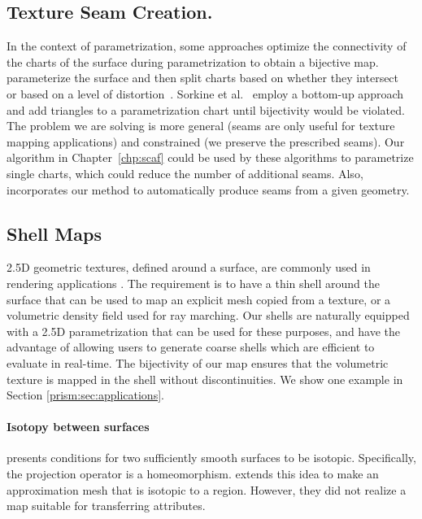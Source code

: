 \subsection*{Texture Seam Creation.}
In the context of parametrization, some approaches optimize the connectivity of the charts of the surface during parametrization to obtain a bijective map.  \cite{Levy:2002,Zhou:2004} parameterize the surface and then split charts based on whether they intersect~\cite{Levy:2002} or based on a level of distortion~\cite{Zhou:2004}.  Sorkine et al.~\cite{Sorkine:2002} employ a bottom-up approach and add triangles to a parametrization chart until bijectivity would be violated. The problem we are solving is more general (seams are only useful for texture mapping applications) and constrained (we preserve the prescribed seams). Our algorithm in Chapter~\ref{chp:scaf} could be used by these algorithms to parametrize single charts, which could reduce the number of additional seams. Also, \cite{li2018optcuts} incorporates our method to automatically produce seams from a given geometry.

\subsection*{Shell Maps}
2.5D geometric textures, defined around a surface, are commonly used in rendering applications \cite{wang2003view,wang2004generalized,porumbescu2005shell,peng2004interactive,lengyel2001real,chen2004shell,huang2007gradient,jin2019shell}. The requirement is to have a thin shell around the surface that can be used to map an explicit mesh copied from a texture, or a volumetric density field used for ray marching. Our shells are naturally equipped with a 2.5D parametrization that can be used for these purposes, and have the advantage of allowing users to  generate coarse shells which are efficient to evaluate in real-time. The bijectivity of our map ensures that the  volumetric texture is mapped in the shell without discontinuities. We show one example in Section \ref{prism:sec:applications}.

\paragraph{Isotopy between surfaces}
{\cite{chazal2005condition,chazal2010ball}} presents conditions for two {sufficiently} smooth surfaces {to be isotopic. Specifically, the projection operator is a homeomorphism.} \cite{mandad2015isotopic} extends this idea to make an approximation mesh that is isotopic to a region. However, they {did} not realize a map suitable for {transferring attributes}.

